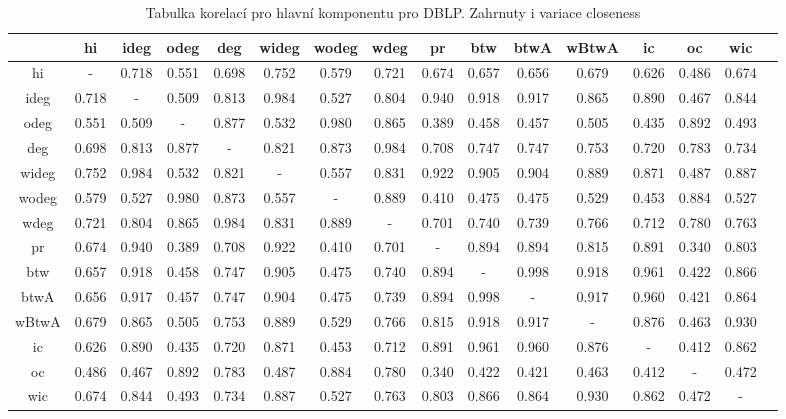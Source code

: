 \documentclass{bakalarka}
\begin{document}
\begin{table}[!ht]
\centering
\caption{Tabulka korelací pro hlavní komponentu pro DBLP. Zahrnuty i variace closeness}
\label{tab:corr2}
\begin{sideways}
\begin{footnotesize}
\begin{tabular}{c|ccccccccccccccc}
\toprule
&hi  &ideg &odeg &deg  &wideg&wodeg&wdeg &pr   &btw  &btwA &wBtwA&ic   &oc   &wic\\
\midrule
hi   &  -  &0.718&0.551&0.698&0.752&0.579&0.721&0.674&0.657&0.656&0.679&0.626&0.486&0.674\\
ideg &0.718&  -  &0.509&0.813&0.984&0.527&0.804&0.940&0.918&0.917&0.865&0.890&0.467&0.844\\
odeg &0.551&0.509&  -  &0.877&0.532&0.980&0.865&0.389&0.458&0.457&0.505&0.435&0.892&0.493\\
deg  &0.698&0.813&0.877&  -  &0.821&0.873&0.984&0.708&0.747&0.747&0.753&0.720&0.783&0.734\\
wideg&0.752&0.984&0.532&0.821&  -  &0.557&0.831&0.922&0.905&0.904&0.889&0.871&0.487&0.887\\
wodeg&0.579&0.527&0.980&0.873&0.557&  -  &0.889&0.410&0.475&0.475&0.529&0.453&0.884&0.527\\
wdeg &0.721&0.804&0.865&0.984&0.831&0.889&  -  &0.701&0.740&0.739&0.766&0.712&0.780&0.763\\
pr   &0.674&0.940&0.389&0.708&0.922&0.410&0.701&  -  &0.894&0.894&0.815&0.891&0.340&0.803\\
btw  &0.657&0.918&0.458&0.747&0.905&0.475&0.740&0.894&  -  &0.998&0.918&0.961&0.422&0.866\\
btwA &0.656&0.917&0.457&0.747&0.904&0.475&0.739&0.894&0.998&  -  &0.917&0.960&0.421&0.864\\
wBtwA&0.679&0.865&0.505&0.753&0.889&0.529&0.766&0.815&0.918&0.917&  -  &0.876&0.463&0.930\\
ic   &0.626&0.890&0.435&0.720&0.871&0.453&0.712&0.891&0.961&0.960&0.876&  -  &0.412&0.862\\
oc   &0.486&0.467&0.892&0.783&0.487&0.884&0.780&0.340&0.422&0.421&0.463&0.412&  -  &0.472\\
wic  &0.674&0.844&0.493&0.734&0.887&0.527&0.763&0.803&0.866&0.864&0.930&0.862&0.472&  -  \\
\bottomrule
\end{tabular}
\end{footnotesize}
\end{sideways}
\end{table}
\end{document}
